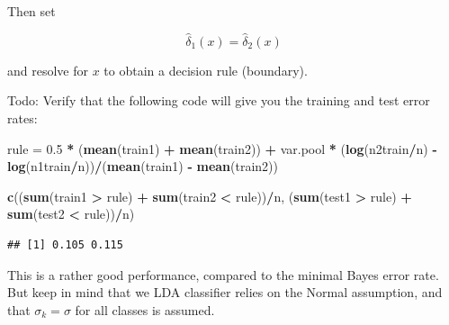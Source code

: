 \documentclass[10pt,ignorenonframetext,]{beamer}
\newenvironment{Shaded}{\begin{snugshade}}{\end{snugshade}}
\newcommand{\KeywordTok}[1]{\textcolor[rgb]{0.13,0.29,0.53}{\textbf{#1}}}
\newcommand{\FloatTok}[1]{\textcolor[rgb]{0.00,0.00,0.81}{#1}}
\newcommand{\StringTok}[1]{\textcolor[rgb]{0.31,0.60,0.02}{#1}}
\newcommand{\OperatorTok}[1]{\textcolor[rgb]{0.81,0.36,0.00}{\textbf{#1}}}
\newcommand{\NormalTok}[1]{#1}
\begin{document}
\begin{frame}[fragile]

Then set

\[\hat\delta_1(x) = \hat\delta_2(x)\]

and resolve for \(x\) to obtain a decision rule (boundary).

\vspace{2mm} Todo: Verify that the following code will give you the
training and test error rates:

\scriptsize

\begin{Shaded}
\begin{Highlighting}[]
\NormalTok{rule =}\StringTok{ }\FloatTok{0.5} \OperatorTok{*}\StringTok{ }\NormalTok{(}\KeywordTok{mean}\NormalTok{(train1) }\OperatorTok{+}\StringTok{ }\KeywordTok{mean}\NormalTok{(train2)) }\OperatorTok{+}\StringTok{ }\NormalTok{var.pool }\OperatorTok{*}\StringTok{ }\NormalTok{(}\KeywordTok{log}\NormalTok{(n2train}\OperatorTok{/}\NormalTok{n) }\OperatorTok{-}\StringTok{ }
\StringTok{    }\KeywordTok{log}\NormalTok{(n1train}\OperatorTok{/}\NormalTok{n))}\OperatorTok{/}\NormalTok{(}\KeywordTok{mean}\NormalTok{(train1) }\OperatorTok{-}\StringTok{ }\KeywordTok{mean}\NormalTok{(train2))}

\KeywordTok{c}\NormalTok{((}\KeywordTok{sum}\NormalTok{(train1 }\OperatorTok{>}\StringTok{ }\NormalTok{rule) }\OperatorTok{+}\StringTok{ }\KeywordTok{sum}\NormalTok{(train2 }\OperatorTok{<}\StringTok{ }\NormalTok{rule))}\OperatorTok{/}\NormalTok{n, (}\KeywordTok{sum}\NormalTok{(test1 }\OperatorTok{>}\StringTok{ }\NormalTok{rule) }\OperatorTok{+}\StringTok{ }\KeywordTok{sum}\NormalTok{(test2 }\OperatorTok{<}\StringTok{ }
\StringTok{    }\NormalTok{rule))}\OperatorTok{/}\NormalTok{n)}
\end{Highlighting}
\end{Shaded}

\begin{verbatim}
## [1] 0.105 0.115
\end{verbatim}

\normalsize

This is a rather good performance, compared to the minimal Bayes error
rate. But keep in mind that we LDA classifier relies on the Normal
assumption, and that \(\sigma_k=\sigma\) for all classes is assumed.

\end{frame}
\end{document}
